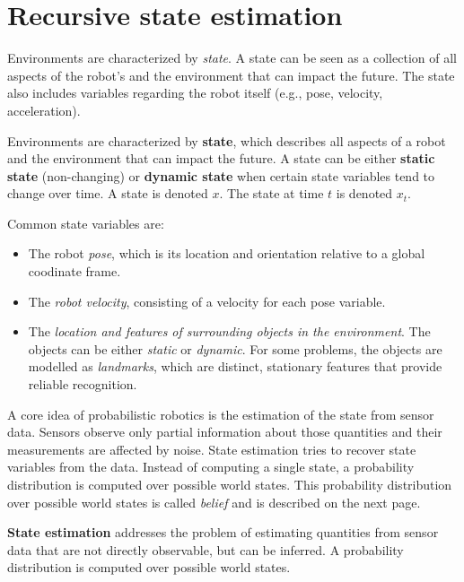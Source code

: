\section{Recursive state estimation}
\label{sec:background-recursive-state-estimation}
Environments are characterized by \textit{state}.
A state can be seen as a collection of all aspects of the robot's and the environment that can impact the future.
The state also includes variables regarding the robot itself (e.g., pose, velocity, acceleration).
\begin{mydef}
Environments are characterized by \textbf{state}, which describes all aspects of a robot and the environment that can impact the future.
A state can be either \textbf{static state} (non-changing) or \textbf{dynamic state} when certain state variables tend to change over time.
A state is denoted $x$.
The state at time $t$ is denoted $x_t$.
\end{mydef}
Common state variables are:
\begin{itemize}
\item The robot \textit{pose}, which is its location and orientation relative to a global coodinate frame.
\item The \textit{robot velocity}, consisting of a velocity for each pose variable.%
\item The \textit{location and features of surrounding objects in the environment}. The objects can be either \textit{static} or \textit{dynamic}. For some problems, the objects are modelled as \textit{landmarks}, which are distinct, stationary features that provide reliable recognition.
\end{itemize}

A core idea of probabilistic robotics is the estimation of the state from sensor data.
Sensors observe only partial information about those quantities and their measurements are affected by noise. 
State estimation tries to recover state variables from the data.
Instead of computing a single state, a probability distribution is computed over possible world states.
This probability distribution over possible world states is called \textit{belief} and is described on the next page.
\begin{mydef}
\textbf{State estimation} addresses the problem of estimating quantities from sensor data that are not directly observable, but can be inferred.
A probability distribution is computed over possible world states.
\end{mydef}

